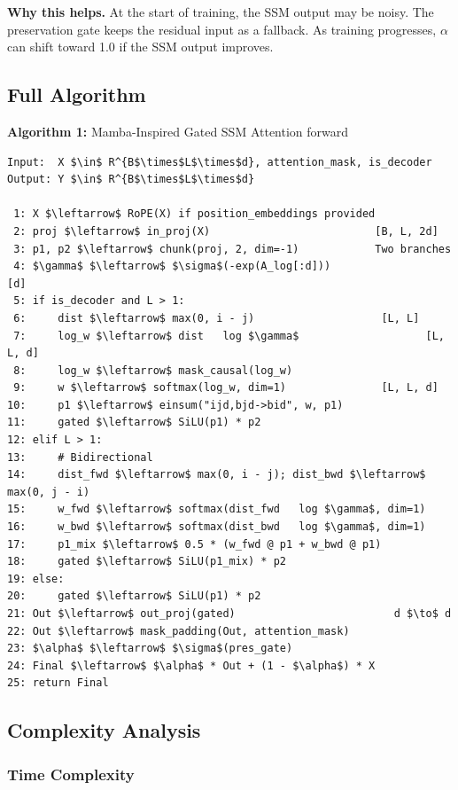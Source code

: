 \textbf{Why this helps.} At the start of training, the SSM output may be noisy. 
The preservation gate keeps the residual input as a fallback. As training 
progresses, $\alpha$ can shift toward 1.0 if the SSM output improves.

\subsection{Full Algorithm}

\textbf{Algorithm 1:} Mamba-Inspired Gated SSM Attention forward
\begin{lstlisting}
Input:  X $\in$ R^{B$\times$L$\times$d}, attention_mask, is_decoder
Output: Y $\in$ R^{B$\times$L$\times$d}

 1: X $\leftarrow$ RoPE(X) if position_embeddings provided
 2: proj $\leftarrow$ in_proj(X)                          [B, L, 2d]
 3: p1, p2 $\leftarrow$ chunk(proj, 2, dim=-1)            Two branches
 4: $\gamma$ $\leftarrow$ $\sigma$(-exp(A_log[:d]))                      [d]
 5: if is_decoder and L > 1:
 6:     dist $\leftarrow$ max(0, i - j)                    [L, L]
 7:     log_w $\leftarrow$ dist   log $\gamma$                    [L, L, d]
 8:     log_w $\leftarrow$ mask_causal(log_w)
 9:     w $\leftarrow$ softmax(log_w, dim=1)               [L, L, d]
10:     p1 $\leftarrow$ einsum("ijd,bjd->bid", w, p1)
11:     gated $\leftarrow$ SiLU(p1) * p2
12: elif L > 1:
13:     # Bidirectional
14:     dist_fwd $\leftarrow$ max(0, i - j); dist_bwd $\leftarrow$ max(0, j - i)
15:     w_fwd $\leftarrow$ softmax(dist_fwd   log $\gamma$, dim=1)
16:     w_bwd $\leftarrow$ softmax(dist_bwd   log $\gamma$, dim=1)
17:     p1_mix $\leftarrow$ 0.5 * (w_fwd @ p1 + w_bwd @ p1)
18:     gated $\leftarrow$ SiLU(p1_mix) * p2
19: else:
20:     gated $\leftarrow$ SiLU(p1) * p2
21: Out $\leftarrow$ out_proj(gated)                         d $\to$ d
22: Out $\leftarrow$ mask_padding(Out, attention_mask)
23: $\alpha$ $\leftarrow$ $\sigma$(pres_gate)
24: Final $\leftarrow$ $\alpha$ * Out + (1 - $\alpha$) * X
25: return Final
\end{lstlisting}

\subsection{Complexity Analysis}

\subsubsection{Time Complexity}


